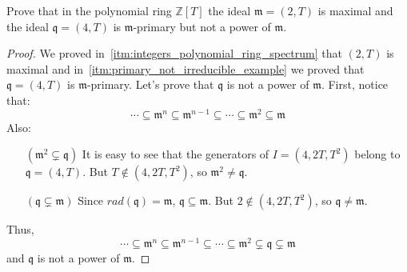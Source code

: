 \begin{problem}
    Prove that in the polynomial ring $\mathbb{Z}[T]$ the ideal $\mathfrak{m} = (2,T)$ is maximal and the ideal $\mathfrak{q} = (4,T)$ is $\mathfrak{m}$-primary but not a power of $\mathfrak{m}$.
    \begin{sol}
        \begin{proof}
            We proved in~\ref{itm:integers_polynomial_ring_spectrum} that $(2,T)$ is maximal and in~\ref{itm:primary_not_irreducible_example} we proved that $\mathfrak{q} = (4,T)$ is $\mathfrak{m}$-primary.
            Let's prove that $\mathfrak{q}$ is not a power of $\mathfrak{m}$.
            First, notice that:
            \[ \cdots \subseteq \mathfrak{m}^n \subseteq \mathfrak{m}^{n-1} \subseteq \cdots \subseteq \mathfrak{m}^2 \subseteq \mathfrak{m} \]
            Also:
            \begin{itemize}
                \item[$(\mathfrak{m}^2 \subsetneq \mathfrak{q})$]
                It is easy to see that the generators of $I = (4, 2T, T^2)$ belong to $\mathfrak{q} =(4,T)$.
                But $T \notin (4, 2T, T^2)$, so $\mathfrak{m}^2 \neq \mathfrak{q}$.
                \item[$(\mathfrak{q} \subsetneq \mathfrak{m})$]
                Since $rad(\mathfrak{q}) = \mathfrak{m}$, $\mathfrak{q} \subseteq \mathfrak{m}$.
                But $2 \notin (4, 2T, T^2)$, so $\mathfrak{q} \neq \mathfrak{m}$.
            \end{itemize}
            Thus,
            \[ \cdots \subseteq \mathfrak{m}^n \subseteq \mathfrak{m}^{n-1} \subseteq \cdots \subseteq \mathfrak{m}^2 \subsetneq \mathfrak{q} \subsetneq \mathfrak{m} \]
            and $\mathfrak{q}$ is not a power of $\mathfrak{m}$.
        \end{proof}
    \end{sol}
\end{problem}